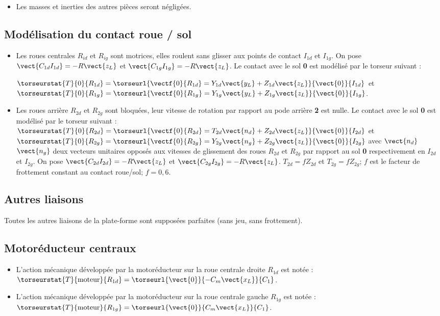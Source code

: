 \begin{itemize}
\item Les masses et inerties des autres pièces seront négligées.
\end{itemize}

\subsection*{Modélisation du contact roue / sol}

\begin{itemize}
\item Les roues centrales $R_{id}$ et $R_{ig}$ sont motrices, elles roulent sans glisser aux points de contact $I_{1d}$ et $I_{1g}$. On pose $\vect{C_{1d}I_{1d}}=-R\vect{z_L}$ et $\vect{C_{1g}I_{1g}}=-R\vect{z_L}$. Le contact avec le sol \textbf{0} est modélisé par le torseur suivant :

$\torseurstat{T}{0}{R_{1d}}=\torseurl{\vectf{0}{R_{1d}}=Y_{1d}\vect{y_L}+Z_{1d}\vect{z_L}}{\vect{0}}{I_{1d}}$
et
$\torseurstat{T}{0}{R_{1g}}=\torseurl{\vectf{0}{R_{1g}}=Y_{1g}\vect{y_L}+Z_{1g}\vect{z_L}}{\vect{0}}{I_{1g}}$.

\item Les roues arrière $R_{2d}$ et $R_{2g}$ sont bloquées, leur vitesse de rotation par rapport au pode arrière \textbf{2} est nulle. Le contact avec le sol \textbf{0} est modélisé par le torseur suivant : 
$\torseurstat{T}{0}{R_{2d}}=\torseurl{\vectf{0}{R_{2d}}=T_{2d}\vect{n_d}+Z_{2d}\vect{z_L}}{\vect{0}}{I_{2d}}$
et
$\torseurstat{T}{0}{R_{2g}}=\torseurl{\vectf{0}{R_{2g}}=Y_{2g}\vect{n_g}+Z_{2g}\vect{z_L}}{\vect{0}}{I_{2g}}$
avec $\vect{n_d}$ $\vect{n_g}$ deux vecteurs unitaires opposés aux vitesses de glissement des roues $R_{2d}$ et $R_{2g}$ par rapport au sol \textbf{0}
respectivement en $I_{2d}$ et $I_{2g}$. On pose $\vect{C_{2d}I_{2d}}=-R\vect{z_L}$ et 
$\vect{C_{2g}I_{2g}}=-R\vect{z_L}$. $T_{2d}=fZ_{2d}$ et $T_{2g}=fZ_{2g}$; $f$ est le facteur de frottement constant au contact roue/sol; $f = 0,6$.
\end{itemize}


\subsection*{Autres liaisons}
Toutes les autres liaisons de la plate-forme sont supposées parfaites (sans jeu, sans frottement).

\subsection*{Motoréducteur centraux}
\begin{itemize}
\item L'action mécanique développée par la motoréducteur sur la roue centrale droite $R_{1d}$ est notée : 
$\torseurstat{T}{\text{moteur}}{R_{1d}} = \torseurl{\vect{0}}{-C_m\vect{x_L}}{C_1}$.
\item L'action mécanique développée par la motoréducteur sur la roue centrale gauche $R_{1g}$ est notée : 
$\torseurstat{T}{\text{moteur}}{R_{1g}} = \torseurl{\vect{0}}{C_m\vect{x_L}}{C_1}$.
\end{itemize}

